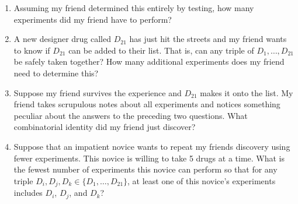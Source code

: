 \documentclass{article}
\begin{document}
\begin{enumerate}

   \item Assuming my friend determined this entirely by testing, how many experiments did my friend have to perform?

   \item A new designer drug called $D_{21}$ has just hit the streets and my friend wants to know if $D_{21}$ can be added to their list. That is, can any triple of $D_1,\ldots,D_{21}$ be safely taken together? How many additional experiments does my friend need to determine this?
   
   \item Suppose my friend survives the experience and $D_{21}$ makes it onto the list. My friend takes scrupulous notes about all experiments and notices something peculiar about the answers to the preceding two questions. What combinatorial identity did my friend just discover?
   
   \item Suppose that an impatient novice wants to repeat my friends discovery using fewer experiments. This novice is willing to take 5 drugs at a time. What is the fewest number of experiments this novice can perform so that for any triple $D_i,D_j,D_k\in\{D_1,\ldots,D_{21}\}$, at least one of this novice's experiments includes $D_i$, $D_j$, and $D_k$?

\end{enumerate}
\end{document}
